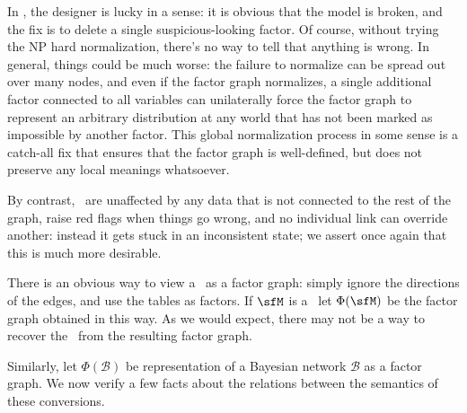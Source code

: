 	In , the designer is lucky in a sense: it is obvious that the model is broken, and the fix is to delete a single suspicious-looking factor. Of course, without trying the NP hard normalization, there's no way to tell that anything is wrong. In general, things could be much worse: the failure to normalize can be spread out over many nodes, and even if the factor graph normalizes, a single additional factor connected to all variables can unilaterally force the factor graph to represent an arbitrary distribution at any world that has not been marked as impossible by another factor. This global normalization process in some sense is a catch-all fix that ensures that the factor graph is well-defined, but does not preserve any local meanings whatsoever.
	
	
	By contrast, \MNs\ are unaffected by any data that is not connected  to the rest of the graph, raise red flags when things go wrong, and no individual link can override another: instead it gets stuck in an inconsistent state; we assert once again that this is much more desirable.
	
	
	
	There is an obvious way to view a \MN\ as a factor graph: simply ignore the directions of the edges, and use the tables as factors. If $\sfM$ is a \MN\, let $\Phi(\sfM)$ be the factor graph obtained in this way. As we would expect, there may not be a way to recover the \MN\ from the resulting factor graph. %
	
	Similarly, let $\Phi(\mathcal B)$ be representation of a Bayesian network $\mathcal B$ as a factor graph. We now verify a few facts about the relations between the semantics of these conversions.
		
